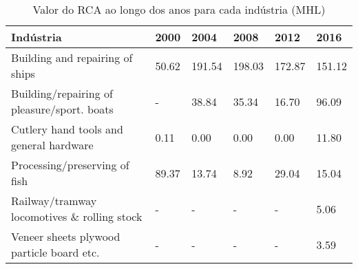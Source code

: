 \begin{table}
\centering
\caption{Valor do RCA ao longo dos anos para cada indústria (MHL)}
\begin{tabular}{p{6cm}p{1.5cm}p{1.5cm}p{1.5cm}p{1.5cm}p{1.5cm}}
\toprule
                                  Indústria &  2000 &   2004 &   2008 &   2012 &   2016 \\
\midrule
            Building and repairing of ships & 50.62 & 191.54 & 198.03 & 172.87 & 151.12 \\
Building/repairing of pleasure/sport. boats &     - &  38.84 &  35.34 &  16.70 &  96.09 \\
    Cutlery hand tools and general hardware &  0.11 &   0.00 &   0.00 &   0.00 &  11.80 \\
              Processing/preserving of fish & 89.37 &  13.74 &   8.92 &  29.04 &  15.04 \\
Railway/tramway locomotives \& rolling stock &     - &      - &      - &      - &   5.06 \\
  Veneer sheets plywood particle board etc. &     - &      - &      - &      - &   3.59 \\
\bottomrule
\end{tabular}
\end{table}
